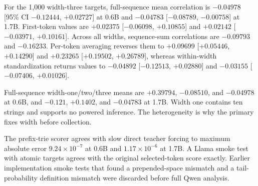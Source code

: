 \documentclass[letterpaper]{article}
\begin{document}
For the 1,000 width-three targets, full-sequence mean correlation is
$-0.04978$ [95\% CI $-0.12444$, $+0.02727$] at 0.6B and $-0.04783$
[$-0.08789$, $-0.00758$] at 1.7B. First-token values are $+0.02375$
[$-0.06098$, $+0.10855$] and $+0.02142$ [$-0.03971$, $+0.10161$]. Across all
widths, sequence-sum correlations are $-0.09793$ and $-0.16233$. Per-token
averaging reverses them to $+0.09699$ [$+0.05446$, $+0.14290$] and $+0.23265$
[$+0.19502$, $+0.26789$], whereas within-width standardization returns values
to $-0.04892$ [$-0.12513$, $+0.02880$] and $-0.03155$ [$-0.07406$,
$+0.01026$].

Full-sequence width-one/two/three means are $+0.39794$, $-0.08510$, and
$-0.04978$ at 0.6B, and $-0.121$, $+0.1402$, and $-0.04783$ at 1.7B. Width one
contains ten strings and supports no powered inference. The heterogeneity is why
the primary fixes width before collection.

The prefix-trie scorer agrees with slow direct teacher forcing to maximum
absolute error $9.24\times10^{-7}$ at 0.6B and
$1.17\times10^{-6}$ at 1.7B. A Llama smoke test with atomic targets agrees with
the original selected-token score exactly. Earlier implementation smoke tests
that found a prepended-space mismatch and a tail-probability definition mismatch
were discarded before full Qwen analysis.
\end{document}
